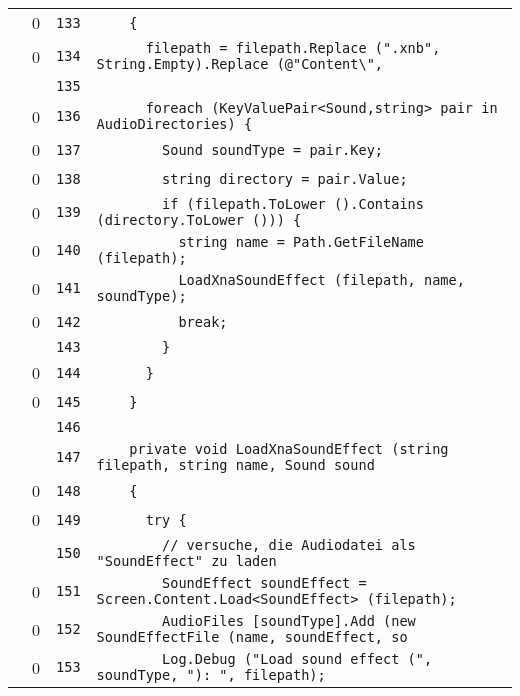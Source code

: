 \documentclass[a4paper,10pt]{article}
\begin{document}
\begin{longtable}[l]{lrrl}
\cellcolor{red} & 0 & \verb~133~ & \verb~    {~\\
\cellcolor{red} & 0 & \verb~134~ & \verb~      filepath = filepath.Replace (".xnb", String.Empty).Replace (@"Content\",~\\
\cellcolor{gray} &  & \verb~135~ & \verb~~\\
\cellcolor{red} & 0 & \verb~136~ & \verb~      foreach (KeyValuePair<Sound,string> pair in AudioDirectories) {~\\
\cellcolor{red} & 0 & \verb~137~ & \verb~        Sound soundType = pair.Key;~\\
\cellcolor{red} & 0 & \verb~138~ & \verb~        string directory = pair.Value;~\\
\cellcolor{red} & 0 & \verb~139~ & \verb~        if (filepath.ToLower ().Contains (directory.ToLower ())) {~\\
\cellcolor{red} & 0 & \verb~140~ & \verb~          string name = Path.GetFileName (filepath);~\\
\cellcolor{red} & 0 & \verb~141~ & \verb~          LoadXnaSoundEffect (filepath, name, soundType);~\\
\cellcolor{red} & 0 & \verb~142~ & \verb~          break;~\\
\cellcolor{gray} &  & \verb~143~ & \verb~        }~\\
\cellcolor{red} & 0 & \verb~144~ & \verb~      }~\\
\cellcolor{red} & 0 & \verb~145~ & \verb~    }~\\
\cellcolor{gray} &  & \verb~146~ & \verb~~\\
\cellcolor{gray} &  & \verb~147~ & \verb~    private void LoadXnaSoundEffect (string filepath, string name, Sound sound~\\
\cellcolor{red} & 0 & \verb~148~ & \verb~    {~\\
\cellcolor{red} & 0 & \verb~149~ & \verb~      try {~\\
\cellcolor{gray} &  & \verb~150~ & \verb~        // versuche, die Audiodatei als "SoundEffect" zu laden~\\
\cellcolor{red} & 0 & \verb~151~ & \verb~        SoundEffect soundEffect = Screen.Content.Load<SoundEffect> (filepath);~\\
\cellcolor{red} & 0 & \verb~152~ & \verb~        AudioFiles [soundType].Add (new SoundEffectFile (name, soundEffect, so~\\
\cellcolor{red} & 0 & \verb~153~ & \verb~        Log.Debug ("Load sound effect (", soundType, "): ", filepath);~\\

\end{longtable}
\end{document}
